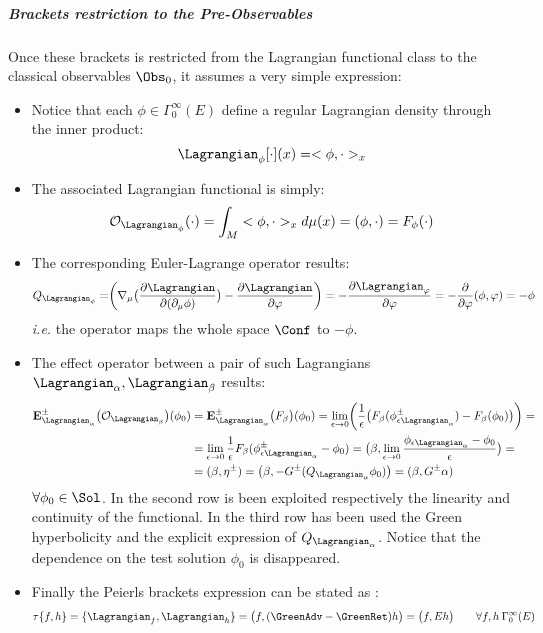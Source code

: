 \documentclass[Main]{subfiles}
\begin{document}
			\subparagraph{Brackets restriction to the Pre-Observables}
				Once these brackets is restricted from the Lagrangian functional class to the classical observables $\Obs_0$, it assumes a very simple expression:
				\begin{itemize}
					\item Notice that each $\phi \in \Gamma_0^\infty(E)$ define a regular Lagrangian density through the inner product:
						\begin{displaymath}
							\Lagrangian_\phi[\cdot](x) = <\phi, \cdot>_x
						\end{displaymath}
					\item The associated Lagrangian functional is simply:
						\begin{displaymath}
							\mathcal{O}_{\Lagrangian_\phi} (\cdot ) = \int_M  <\phi, \cdot>_x d\mu(x) = (\phi, \cdot) = F_\phi (\cdot)
						\end{displaymath}
					\item The corresponding Euler-Lagrange operator  results:
						\begin{displaymath}
							Q_{\Lagrangian_\phi}= \biggr( \nabla_\mu \big( \frac{\partial \Lagrangian}{\partial ( \partial_\mu \phi)} \big) - \frac{\partial \Lagrangian}{\partial \varphi} \biggr) = - \frac{\partial \Lagrangian_\varphi}{\partial \varphi} = -\frac{\partial}{\partial \varphi} (\phi, \varphi) = -\phi
						\end{displaymath}
						\textit{i.e.} the operator maps the whole space $\Conf$ to $-\phi$.
					\item The effect operator between a pair of such Lagrangians $\Lagrangian_\alpha, \Lagrangian_\beta$ results:
						\begin{align}
						\mathbf{E}_{\Lagrangian_\alpha}^\pm \big( \mathcal{O}_{\Lagrangian_\beta} \big) (\phi_0) &= \mathbf{E}_{\Lagrangian_\alpha}^\pm \big( F_\beta  \big) (\phi_0) = \lim_{\epsilon \rightarrow 0} \biggr( \frac{1}{\epsilon}\big(F_\beta ( \phi_{\epsilon \Lagrangian_\alpha}^\pm) - F_\beta(\phi_0) \big) \biggr) =\\
							&= \lim_{\epsilon \rightarrow 0} \frac{1}{\epsilon}F_\beta( \phi_{\epsilon \Lagrangian_\alpha}^\pm - \phi_0) = 
							\big(\beta, \lim_{\epsilon\rightarrow 0} \frac{ \phi_{\epsilon \Lagrangian_\alpha}  - \phi_0}{\epsilon} \big) = \\
							&=(\beta, \eta^\pm) = \big( \beta, - G^\pm (Q_{\Lagrangian_\alpha} \phi_0 ) \big) = ( \beta, G^\pm \alpha)
						\end{align}
						 $\forall 	\phi_0\in \Sol$.
						 In the second row is been exploited respectively the linearity and continuity of the functional.
						 In the third row has been used the Green hyperbolicity and the explicit expression of $Q_{\Lagrangian_\alpha}$.
						 Notice that the dependence on the test solution $\phi_0$ is disappeared.
					\item Finally the Peierls brackets expression can be stated as :
						\begin{equation}\label{Def:SymplecticTau}
							\tau\{f,h\} = \{\Lagrangian_f , \Lagrangian_h\} = \big( f , (\GreenAdv - \GreenRet)h \big) = \big(f, E h\big) \qquad \forall f,h \: \Gamma_0^\infty (E)
						\end{equation}
				\end{itemize}
\end{document}
